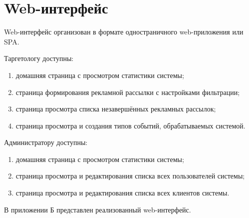 \section{Web-интерфейс}

Web-интерфейс организован в формате одностраничного web-приложения или SPA. 

Таргетологу доступны:
\begin{enumerate}
	\item домашняя страница с просмотром статистики системы;
	\item страница формирования рекламной рассылки с настройками фильтрации;
	\item страница просмотра списка незавершённых рекламных рассылок;
	\item страница просмотра и создания типов событий, обрабатываемых системой.
\end{enumerate}

Администратору доступны:
\begin{enumerate}
	\item домашняя страница с просмотром статистики системы;
	\item страница просмотра и редактирования списка всех пользователей системы;
	\item страница просмотра и редактирования списка всех клиентов системы.
\end{enumerate}


В приложении Б представлен реализованный web-интерфейс.

